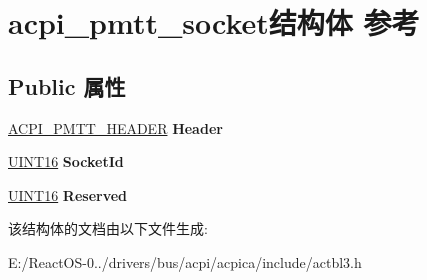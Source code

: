 \hypertarget{structacpi__pmtt__socket}{}\section{acpi\+\_\+pmtt\+\_\+socket结构体 参考}
\label{structacpi__pmtt__socket}
\subsection*{Public 属性}
\begin{DoxyCompactItemize}
\item 
\mbox{\label{structacpi__pmtt__socket_ae4c2f350b74da22f30cfcabb1f6a6358}} 
\hyperlink{structacpi__pmtt__header}{A\+C\+P\+I\+\_\+\+P\+M\+T\+T\+\_\+\+H\+E\+A\+D\+ER} {\bfseries Header}
\item 
\mbox{\label{structacpi__pmtt__socket_a3ca038dd374f3d1b5f276df98aefb439}} 
\hyperlink{_processor_bind_8h_a09f1a1fb2293e33483cc8d44aefb1eb1}{U\+I\+N\+T16} {\bfseries Socket\+Id}
\item 
\mbox{\label{structacpi__pmtt__socket_a91a196f477770f6ed3362858fdc7a1af}} 
\hyperlink{_processor_bind_8h_a09f1a1fb2293e33483cc8d44aefb1eb1}{U\+I\+N\+T16} {\bfseries Reserved}
\end{DoxyCompactItemize}


该结构体的文档由以下文件生成\+:\begin{DoxyCompactItemize}
\item 
E\+:/\+React\+O\+S-\/0../drivers/bus/acpi/acpica/include/actbl3.\+h\end{DoxyCompactItemize}
